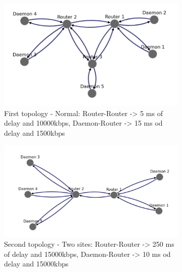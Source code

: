 \documentclass{eplmastersthesis}
\begin{document}
          \begin{figure}[H]
            \centering
            \begin{subfigure}{0.6\textwidth}
              \centering
              \includegraphics[width=1.0\linewidth]{figures/user_case/raft_topo_1.png}
              \caption{First topology - Normal: Router-Router -> 5 ms of delay and 10000kbps, Daemon-Router -> 15 ms od delay and 1500kbps}
              \label{fig:topo1}
            \end{subfigure}
            \centering
            \begin{subfigure}{0.6\textwidth}
              \centering
              \includegraphics[width=1.0\linewidth]{figures/user_case/raft_topo_2.png}
              \caption{Second topology - Two sites: Router-Router -> 250 ms of delay and 15000kbps, Daemon-Router -> 10 ms od delay and 15000kbps}
              \label{fig:topo2}
            \end{subfigure}
            \centering
            \begin{subfigure}{0.6\textwidth}
              \centering

\end{subfigure}
\end{figure}
\end{document}
